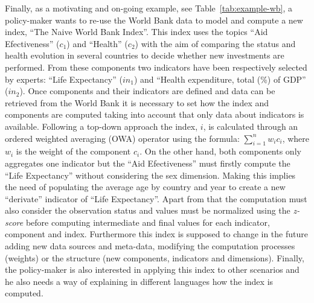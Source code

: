 Finally, as a motivating and on-going example, see Table~\ref{tab:example-wb}, a policy-maker wants to re-use the World Bank data to model and compute a new index, ``The Naive World Bank Index''. This 
index uses the topics ``Aid Efectiveness'' ($c_1$) and ``Health'' ($c_2$) with the aim of comparing the status and health evolution in several countries to decide whether new 
investments are performed. From these components two indicators have been respectively selected by experts: ``Life Expectancy'' ($in_1$) and ``Health expenditure, total (\%) of GDP'' ($in_2$). 
Once components and their indicators are defined and data can be retrieved from the World Bank it is necessary to set how the index and components are computed 
taking into account that only data about indicators is available. Following a top-down approach the index, $i$, is calculated through an ordered weighted averaging (OWA) operator using the 
formula: $\sum_{i=1}^n  w_i c_i$, where $w_i$ is the weight of the component $c_i$. On the other hand, both components only aggregates one indicator but the ``Aid Efectiveness'' 
must firstly compute the ``Life Expectancy'' without considering the sex dimension. Making this implies the need of populating the average age by country and year to create 
a new ``derivate'' indicator of ``Life Expectancy''. Apart from that the computation must also consider the observation status and values must be normalized using the 
\textit{z-score} before computing intermediate and final values for each indicator, component and index. Furthermore this index is supposed to change in the future 
adding new data sources and meta-data, modifying the computation processes (weights) or the structure (new components, indicators and dimensions). Finally, the policy-maker 
is also interested in applying this index to other scenarios and he also needs a way of explaining in different languages how the index is computed. 


